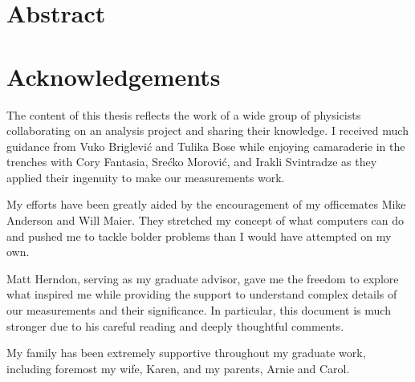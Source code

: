 

\frontmatter

\thetitlepage
\cleardoublepage
\setcounter{page}{1}

\section{Abstract}
\uwabstract
\cleardoublepage

\section{Acknowledgements}
The content of this thesis reflects the work of a wide group of physicists collaborating on an analysis project and sharing their knowledge.  I received much guidance from Vuko Briglevi\'{c} and Tulika Bose while enjoying camaraderie in the trenches with Cory Fantasia, Sre\'{c}ko Morovi\'{c}, and Irakli Svintradze as they applied their ingenuity to make our measurements work.

My efforts have been greatly aided by the encouragement of my officemates Mike Anderson and Will Maier.  They stretched my concept of what computers can do and pushed me to tackle bolder problems than I would have attempted on my own.

Matt Herndon, serving as my graduate advisor, gave me the freedom to explore what inspired me while providing the support to understand complex details of our measurements and their significance.  In particular, this document is much stronger due to his careful reading and deeply thoughtful comments.

My family has been extremely supportive throughout my graduate work, including foremost my wife, Karen, and my parents, Arnie and Carol.

\clearpage

\tableofcontents\clearpage
\listoffigures\clearpage
\listoftables\clearpage

\mainmatter
\linenumbers




% 
% 


